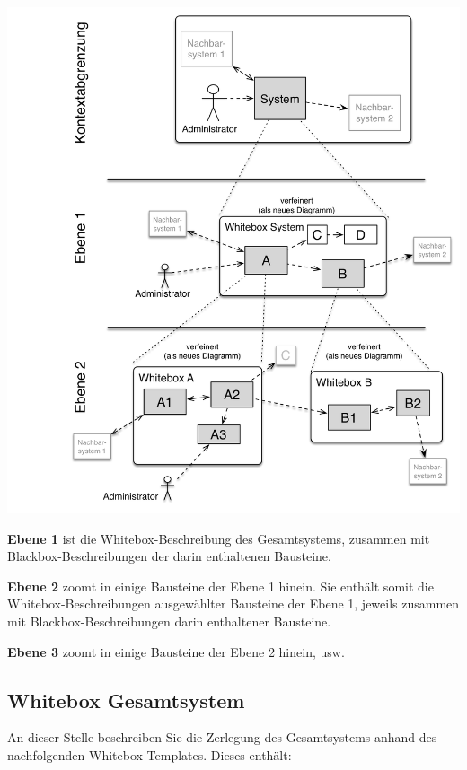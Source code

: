 \documentclass[]{article}
\begin{document}
\includegraphics{images/05_building_blocks-DE.png}

\textbf{Ebene 1} ist die Whitebox-Beschreibung des Gesamtsystems,
zusammen mit Blackbox-Beschreibungen der darin enthaltenen Bausteine.

\textbf{Ebene 2} zoomt in einige Bausteine der Ebene 1 hinein. Sie
enthält somit die Whitebox-Beschreibungen ausgewählter Bausteine der
Ebene 1, jeweils zusammen mit Blackbox-Beschreibungen darin enthaltener
Bausteine.

\textbf{Ebene 3} zoomt in einige Bausteine der Ebene 2 hinein, usw.

\subsection{Whitebox Gesamtsystem}\label{_whitebox_gesamtsystem}

An dieser Stelle beschreiben Sie die Zerlegung des Gesamtsystems anhand
des nachfolgenden Whitebox-Templates. Dieses enthält:
\end{document}
